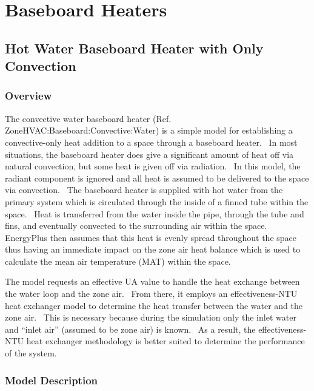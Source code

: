 \section{Baseboard Heaters }\label{baseboard-heaters}

\subsection{Hot Water Baseboard Heater with Only Convection}\label{hot-water-baseboard-heater-with-only-convection}

\subsubsection{Overview}\label{overview-006}

The convective water baseboard heater (Ref. ZoneHVAC:Baseboard:Convective:Water) is a simple model for establishing a convective-only heat addition to a space through a baseboard heater.~ In most situations, the baseboard heater does give a significant amount of heat off via natural convection, but some heat is given off via radiation.~ In this model, the radiant component is ignored and all heat is assumed to be delivered to the space via convection.~ The baseboard heater is supplied with hot water from the primary system which is circulated through the inside of a finned tube within the space.~ Heat is transferred from the water inside the pipe, through the tube and fins, and eventually convected to the surrounding air within the space.~ EnergyPlus then assumes that this heat is evenly spread throughout the space thus having an immediate impact on the zone air heat balance which is used to calculate the mean air temperature (MAT) within the space.

The model requests an effective UA value to handle the heat exchange between the water loop and the zone air.~ From there, it employs an effectiveness-NTU heat exchanger model to determine the heat transfer between the water and the zone air.~ This is necessary because during the simulation only the inlet water and ``inlet air'' (assumed to be zone air) is known.~ As a result, the effectiveness-NTU heat exchanger methodology is better suited to determine the performance of the system.

\subsubsection{Model Description}\label{model-description-003}

